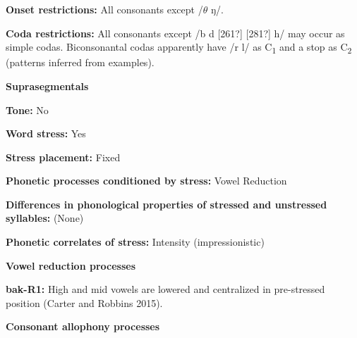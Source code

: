 \begin{styleBody}
\textbf{Onset restrictions:} All consonants except /$\theta $ ŋ/.
\end{styleBody}

\begin{styleBody}
\textbf{Coda restrictions:} All consonants except /b d [261?] [281?] h/ may occur as simple codas. Biconsonantal codas apparently have /r l/ as C\textsubscript{1} and a stop as C\textsubscript{2} (patterns inferred from examples).
\end{styleBody}

\begin{styleBody}
\textbf{Suprasegmentals}
\end{styleBody}

\begin{styleBody}
\textbf{Tone:} No
\end{styleBody}

\begin{styleBody}
\textbf{Word stress:} Yes
\end{styleBody}

\begin{styleBody}
\textbf{Stress placement:} Fixed
\end{styleBody}

\begin{styleBody}
\textbf{Phonetic processes conditioned by stress:} Vowel Reduction
\end{styleBody}

\begin{styleBody}
\textbf{Differences in phonological properties of stressed and unstressed syllables:} (None)
\end{styleBody}

\begin{styleBody}
\textbf{Phonetic correlates of stress: }Intensity (impressionistic)
\end{styleBody}

\begin{styleBody}
\textbf{Vowel reduction processes}
\end{styleBody}

\begin{styleBody}
\textbf{bak-R1:} High and mid vowels are lowered and centralized in pre-stressed position (Carter and Robbins 2015).
\end{styleBody}

\begin{styleBody}
\textbf{Consonant allophony processes}
\end{styleBody}

